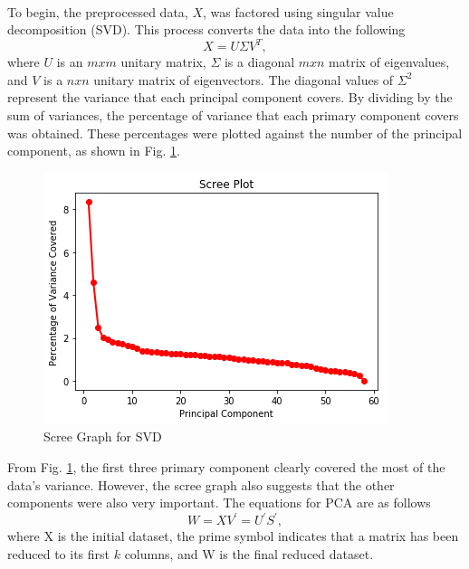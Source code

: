 \documentclass[12pt]{article}
\begin{document}
	\paragraph{}
	To begin, the preprocessed data, $X$, was factored using singular value decomposition (SVD). This process converts the data into the following
	\begin{equation}
	X = U \Sigma V^T,
	\end{equation}
	where $U$ is an $m x m$ unitary matrix, $\Sigma$ is a diagonal $m x n$ matrix of eigenvalues, and $V$ is a $n x n$ unitary matrix of eigenvectors. The diagonal values of $\Sigma^2$ represent the variance that each principal component covers. By dividing by the sum of variances, the percentage of variance that each primary component covers was obtained. These percentages were plotted against the number of the principal component, as shown in Fig. \ref{Scree}.
	\begin{center}
		\begin{figure}[H]
			\includegraphics[width=0.75\linewidth]{scree.png}
			\caption{Scree Graph for SVD}
			\label{Scree}
		\end{figure}
	\end{center}
    From Fig. \ref{Scree}, the first three primary component clearly covered the most of the data's variance. However, the scree graph also suggests that the other components were also very important. The equations for PCA are as follows
    \begin{equation}
    W = XV^\prime = U^\prime S^\prime,
    \end{equation}
    where X is the initial dataset, the prime symbol indicates that a matrix has been reduced to its first $k$ columns, and W is the final reduced dataset.
\end{document}

